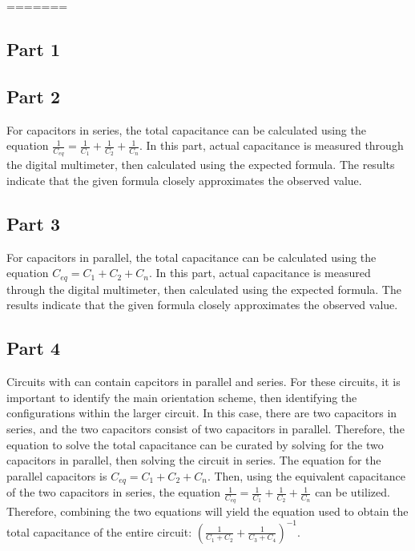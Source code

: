 \documentclass[titlepage]{article}
\begin{document}
    

=======
   	\subsection{Part 1} 
   	\subsection{Part 2} 
	For capacitors in series, the total capacitance can be calculated using the equation $\frac{1}{C_{eq}} = \frac{1}{C_1} + \frac{1}{C_2} + \frac{1}{C_n}$. In this part, actual capacitance is measured through the digital multimeter, then calculated using the expected formula. The results indicate that the given formula closely approximates the observed value. 
   	\subsection{Part 3} 
	For capacitors in parallel, the total capacitance can be calculated using the equation ${C_{eq}} = C_1 + C_2 + C_n$. In this part, actual capacitance is measured through the digital multimeter, then calculated using the expected formula. The results indicate that the given formula closely approximates the observed value. 

   	\subsection{Part 4} 
	Circuits with can contain capcitors in parallel and series. For these circuits, it is important to identify the main orientation scheme, then identifying the configurations within the larger circuit. In this case, there are two capacitors in series, and the two capacitors consist of two capacitors in parallel. Therefore, the equation to solve the total capacitance can be curated by solving for the two capacitors in parallel, then solving the circuit in series. The equation for the parallel capacitors is  ${C_{eq}} = C_1 + C_2 + C_n$. Then, using the equivalent capacitance of the two capacitors in series, the equation $\frac{1}{C_{eq}} = \frac{1}{C_1} + \frac{1}{C_2} + \frac{1}{C_n}$ can be utilized. Therefore, combining the two equations will yield the equation used to obtain the total capacitance of the entire circuit: $\left(\frac{1}{C_1 + C_2} + \frac{1}{C_3 + C_4}\right)^{-1}$.
\end{document}
